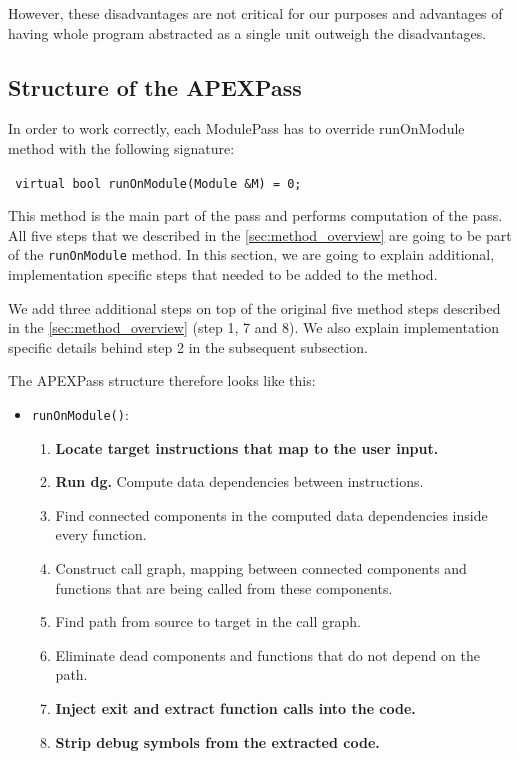 \documentclass[12pt, twoside]{fithesis2}
\renewcommand{\_}{\leavevmode \kern0.07em\vbox{\hrule width0.4em}}
\newcommand{\squarebullet}{\textcolor{black}{\raisebox{0.15em}{\rule{4pt}{4pt}}}}
\newenvironment{myItemize}{
  \begin{itemize}[
    leftmargin=2em,
    rightmargin=1em,
    itemsep=\parskip,
    parsep=0em,
    topsep=0em,
    partopsep=0em
]
  \renewcommand{\labelitemi}{\squarebullet}
  \renewcommand{\labelitemii}{\textbullet}
}{
  \end{itemize}
}
\newenvironment{myEnumerate}{
  \begin{enumerate}[
    leftmargin=2em,
    rightmargin=1em,
    itemsep=\parskip,
    parsep=0em,
    topsep=0em,
    partopsep=0em
]
}{
  \end{enumerate}
}
\begin{document}
However, these disadvantages are not critical for our purposes and advantages
of having whole program abstracted as a single unit outweigh the disadvantages.

\subsection{Structure of the APEXPass}

In order to work correctly, each ModulePass has to override runOnModule method
with the following signature:

\texttt{
virtual bool runOnModule(Module &M) = 0;
}

This method is the main part of the pass and performs computation of the pass.
All five steps that we described in the \autoref{sec:method_overview} are going
to be part of the \texttt{runOnModule} method.
In this section, we are going to explain
additional, implementation specific steps that needed to be added to
the method.

We add three additional steps on top of the original five method steps
described in the \autoref{sec:method_overview} (step 1, 7 and 8). We also
explain implementation specific details behind step 2 in the subsequent
subsection.

The APEXPass structure therefore looks like this:

\begin{myItemize}
\item{\texttt{runOnModule()}:}

\begin{myEnumerate}
\item{\textbf{Locate target instructions that map to the user input.}}
\item \textbf{Run dg.} Compute data dependencies between instructions.
\item Find connected components in the computed data dependencies inside
every function.
\item Construct call graph, mapping between connected components and functions
that are being called from these components.
\item Find path from source to target in the call graph.
\item Eliminate dead components and functions that do not depend on the path.
\item{\textbf{Inject exit and extract function calls into the code.}}
\item{\textbf{Strip debug symbols from the extracted code.}}
\end{myEnumerate}

\end{myItemize}
\end{document}
